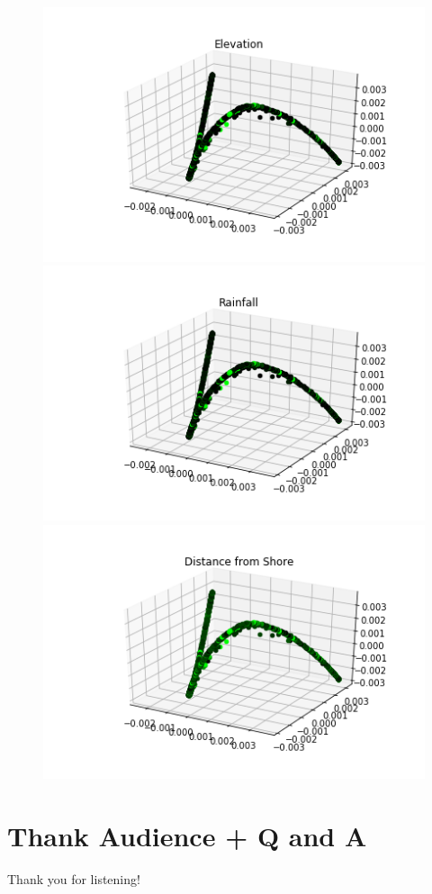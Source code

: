 \documentclass{beamer}
\begin{document}
\begin{frame}
  \begin{figure}
\begin{center}
  \includegraphics[width=.40\linewidth]{elevation.png}\\
  \includegraphics[width=.40\linewidth]{rainfall.png}\\
  \includegraphics[width=.40\linewidth]{distance_from_shore.png}
   \label{fig:data_curve}
  \end{center}
\end{figure}
\end{frame}

\section{Thank Audience + Q and A}

\begin{frame}
  \centering Thank you for listening!
\end{frame}
\end{document}
